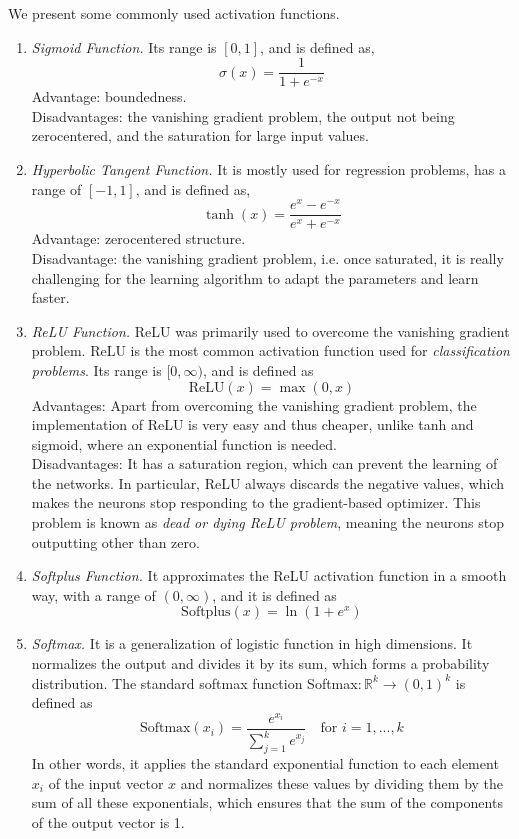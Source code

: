 \documentclass{article}
\begin{document}
We present some commonly used activation functions.
\begin{enumerate}
  \item \textit{Sigmoid Function.} Its range is $[0,1]$, and is defined as,
$$\sigma(x) = \frac{1}{1 + e^{-x}}$$
Advantage: boundedness. \\ Disadvantages:
the vanishing gradient problem, the output not being zerocentered, and the saturation for large input values. 
  \item \textit{Hyperbolic Tangent Function.} It is mostly used for
regression problems, has a range of $[-1,1]$, and is defined as,
$$\tanh(x) = \frac{e^{x} - e^{-x}}{e^{x} + e^{-x}}$$
Advantage: zerocentered structure. \\
Disadvantage: the vanishing gradient problem, i.e. once saturated, it is really challenging
for the learning algorithm to adapt the parameters and learn
faster.
  \item \textit{ReLU Function.} ReLU was primarily used to overcome the vanishing gradient problem. ReLU is the most common activation function used for \textit{classification problems}. Its range is $[0, \infty)$, and is defined as
  $$\text{ReLU}(x) = \max(0, x)$$
Advantages: Apart from overcoming the vanishing gradient problem, the
implementation of ReLU is very easy and thus cheaper, unlike
tanh and sigmoid, where an exponential function is needed.
\\
Disadvantages: It has a saturation region, which can prevent the
learning of the networks. In particular, ReLU always discards
the negative values, which makes the neurons stop responding to
the gradient-based optimizer. This problem is known as \textit{dead
or dying ReLU problem}, meaning the neurons stop
outputting other than zero. 
  \item \textit{Softplus Function.} It approximates the ReLU activation function in a smooth way, with a range of $(0, \infty)$, and it is defined as
$$\text{Softplus}(x) = \ln (1+ e^x) $$
  \item \textit{Softmax.} It is a generalization of logistic
function in high dimensions. It normalizes the output and
divides it by its sum, which forms a probability distribution. The standard softmax function Softmax$: \mathbb{R}^k \to (0,1)^k$ is defined as 
$$\text{Softmax}(x_i) = \frac{e^{x_i}}{\sum^{k}_{j=1} e^{x_j}} \quad \text{for } i= 1,...,k   $$
In other words, it applies
the standard exponential function to each element $x_i$
of the input vector $x$ and normalizes these values by
dividing them by the sum of all these exponentials, which ensures that the sum of the components of the output vector is 1.
\end{enumerate}
\end{document}
